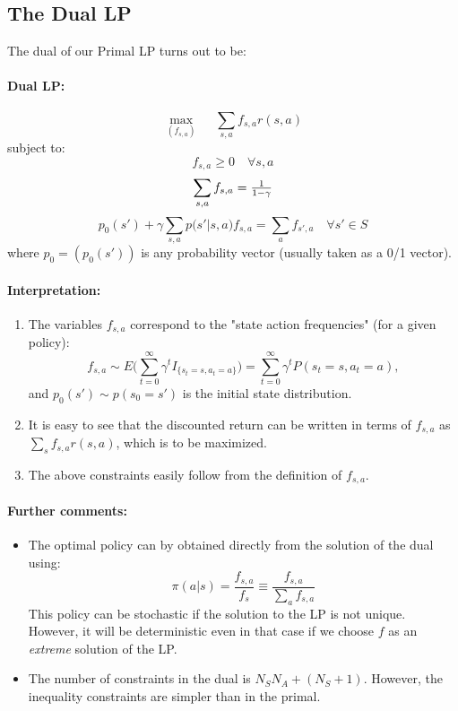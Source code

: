 \subsection{The Dual LP}
The dual of our Primal LP turns out to be:

\paragraph{Dual LP:} 	\[\mathop {\max }\limits_{({f_{s,a}})} \quad \;\sum\limits_{s,a} {{f_{s,a}}r(s,a)} \]
   		subject to:	\[{f_{s,a}} \ge 0\quad \forall s,a\]
				\[\sum\limits_{s,a} {{f_{s,a}}}  = {\textstyle{1 \over {1 - \gamma }}}\]
				\[{p_0}(s') + \gamma \sum\limits_{s,a} {p(} s'|s,a){f_{s,a}} = \sum\limits_{a} {{f_{s',a}}\quad \forall s'}  \in S\]
where ${p_0} = ({p_0}(s'))$ is any probability vector (usually taken as a 0/1 vector).

\paragraph{Interpretation:}
\begin{enumerate}
  \item The variables ${f_{s,a}}$ correspond to the "state action frequencies" (for a given policy):
                            \[{f_{s,a}} \sim E(\sum\limits_{t = 0}^\infty  {{\gamma ^t}{I_{\{ {s_t} = s,{a_t} = a\} }})}  = \sum\limits_{t = 0}^\infty  {{\gamma ^t}P({s_t} = s,{a_t} = a)}, \]
and ${p_0}(s') \sim p({s_0} = s')$ is the initial state distribution.
  \item It is easy to see that the discounted return can be written in terms of ${f_{s,a}}$ as $\sum\limits_s {{f_{s,a}}r(s,a)} $, which is to be maximized.
  \item The above constraints easily follow from the definition of ${f_{s,a}}$.
\end{enumerate}
\paragraph{Further comments:}
\begin{itemize}
  \item The optimal policy can by obtained directly from the solution of the dual using:
                                           \[\pi (a|s) = \frac{{{f_{s,a}}}}{{{f_s}}} \equiv \frac{{{f_{s,a}}}}{{\sum\nolimits_a {{f_{s,a}}} }}\]
This policy can be stochastic if the solution to the LP is not unique. However, it will be deterministic even in that case if we choose $f$ as an \emph{extreme} solution of the LP.
  \item The number of constraints in the dual is ${N_S}{N_A} + ({N_S} + 1)$. However, the inequality constraints are simpler than in the primal.
\end{itemize}
